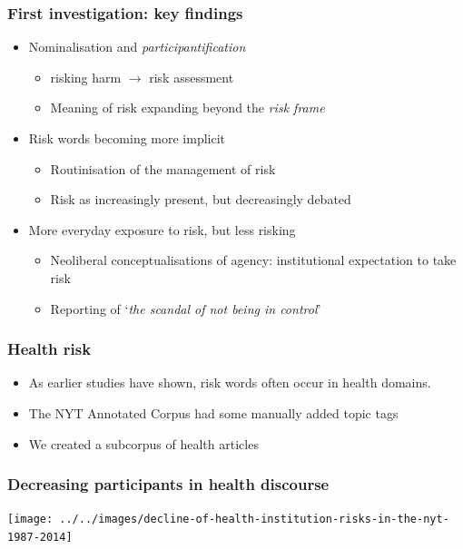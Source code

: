 \documentclass{beamer}       %
\begin{document}
\begin{frame}
    \frametitle{First investigation: key findings}
    
    \begin{itemize}
    \item Nominalisation and \emph{participantification}
    \begin{itemize}
        \item risking harm $\rightarrow$ risk assessment
        \item Meaning of risk expanding beyond the \emph{risk frame}
    \end{itemize}
    \item Risk words becoming more implicit
    \begin{itemize}
        \item Routinisation of the management of risk
        \item Risk as increasingly present, but decreasingly debated
    \end{itemize}
    \item More everyday exposure to risk, but less risking
    \begin{itemize}
        \item Neoliberal conceptualisations of agency: institutional expectation to take risk
        \item Reporting of `\emph{the scandal of not being in control}' \cite{beck_risk_1992}
    \end{itemize}
    \end{itemize}
\end{frame}

\begin{frame}\frametitle{Health risk}

\begin{itemize}
\item As earlier studies have shown, risk words often occur in health domains.
\item The NYT Annotated Corpus had some manually added topic tags
\item We created a subcorpus of health articles
\end{itemize}
\end{frame}

\begin{frame}
    \frametitle{Decreasing participants in health discourse}
    \centering
    \texttt{[image: ../../images/decline-of-health-institution-risks-in-the-nyt-1987-2014]}
\end{frame}
\end{document}
